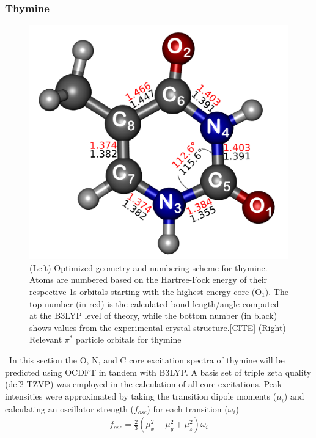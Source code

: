 \documentclass[12pt]{article}
\begin{document}
\subsubsection{Thymine}
  \begin{figure}[ht!]
  \centering
  \includegraphics[scale=0.60]{g130.png}
  \caption{(Left) Optimized geometry and numbering scheme for thymine. Atoms are numbered based on the Hartree-Fock energy of their respective 1s orbitals starting with the highest energy core (O$_1$). The top number (in red) is the calculated bond length/angle computed at the B3LYP level of theory, while the bottom number (in black) shows values from the experimental crystal structure.[CITE] (Right) Relevant $\pi^*$ particle orbitals for thymine}
  \end{figure}
  \ In this section the O, N, and C core excitation spectra of thymine will be predicted using OCDFT in tandem with B3LYP.  A basis set of triple zeta quality (def2-TZVP) was employed in the calculation of all core-excitations. Peak intensities were approximated by taking the transition dipole moments ($\mu_i$) and calculating an oscillator strength ($f_{osc} $) for each transition ($\omega_{i}$)
  \begin{align}
  f_{osc} = \frac{2}{3} (\mu_x^2 + \mu_y^2 + \mu_z^2) \omega_{i}
  \end{align}
\end{document}

